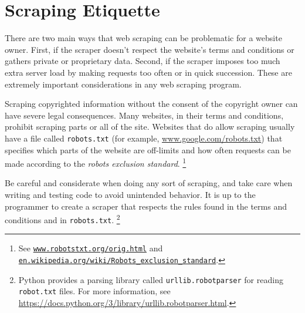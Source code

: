 

\section*{Scraping Etiquette} %


There are two main ways that web scraping can be problematic for a website owner.
First, if the scraper doesn't respect the website's terms and conditions or gathers private or proprietary data.
Second, if the scraper imposes too much extra server load by making requests too often or in quick succession.
These are extremely important considerations in any web scraping program.

\begin{warn} %
Scraping copyrighted information without the consent of the copyright owner can have severe legal consequences.
Many websites, in their terms and conditions, prohibit scraping parts or all of the site.
Websites that do allow scraping usually have a file called \texttt{robots.txt} (for example, \url{www.google.com/robots.txt}) that specifies which parts of the website are off-limits and how often requests can be made according to the \emph{robots exclusion standard}.%
\footnote{See \href{http://www.robotstxt.org/orig.html}{\texttt{www.robotstxt.org/orig.html}} and \href{https://en.wikipedia.org/wiki/Robots_exclusion_standard}{\texttt{en.wikipedia.org/wiki/Robots\_exclusion\_standard}}.}

Be careful and considerate when doing any sort of scraping, and take care when writing and testing code to avoid unintended behavior.
It is up to the programmer to create a scraper that respects the rules found in the terms and conditions and in \texttt{robots.txt}.%
\footnote{Python provides a parsing library called \texttt{urllib.robotparser} for reading \texttt{robot.txt} files.
For more information, see \url{https://docs.python.org/3/library/urllib.robotparser.html}.
}
\end{warn}

